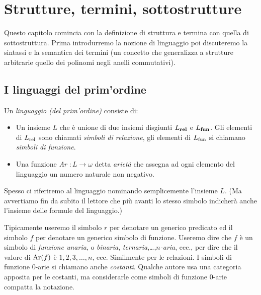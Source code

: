 \chapter{Strutture, termini, sottostrutture}\label{termini}

Questo capitolo comincia con la definizione di struttura e termina con quella di sottostruttura. Prima introdurremo la nozione di linguaggio poi discuteremo la sintassi e la semantica dei termini (un concetto che generalizza a strutture arbitrarie quello dei polinomi negli anelli commutativi).


\section{I linguaggi del prim'ordine}

Un \emph{linguaggio (del prim'ordine)\/} consiste di:

\begin{itemize}
\item Un insieme $L$ che \`e unione di due insiemi disgiunti \emph{$L_{\rm\bf rel}$\/} e \emph{$L_{\rm\bf fun}$}. Gli elementi di $L_{\rm rel}$ sono chiamati \emph{simboli di relazione}, gli elementi di $L_{\rm fun}$ si chiamano \emph{simboli di funzione}.
\item Una funzione \emph{Ar} $:L\to\omega$ detta \emph{ariet\`a\/} che assegna ad ogni elemento del linguaggio un numero naturale non negativo.
\end{itemize}

Spesso ci riferiremo al linguaggio nominando semplicemente l'insieme $L$. (Ma avvertiamo fin da subito il lettore che pi\`u avanti lo stesso simbolo indicher\`a anche l'insieme delle formule del linguaggio.)

Tipicamente useremo il simbolo $r$ per denotare un generico predicato ed il simbolo $f$ per denotare un generico simbolo di funzione. Useremo dire che $f$ \`e un simbolo di \emph{funzione unaria}, o \emph{binaria}, \emph{ternaria},\dots,\emph{$n$-aria}, ecc., per dire che il valore di ${\rm Ar}(f)$ \`e $1, 2, 3,\dots,n$, ecc. Similmente per le relazioni. I simboli di funzione $0$-arie si chiamano anche \emph{costanti\/}. Qualche autore usa una categoria apposita per le costanti, ma considerarle come simboli di funzione $0$-arie compatta la notazione.

